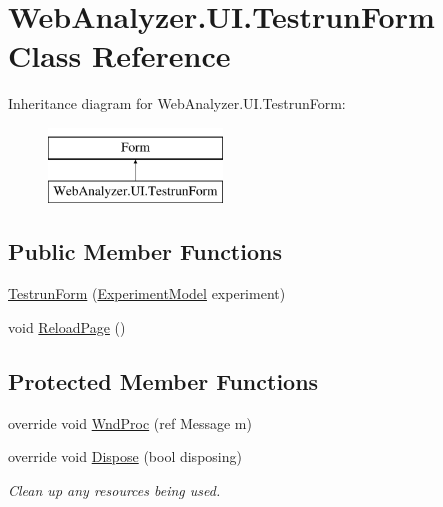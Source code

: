 \hypertarget{class_web_analyzer_1_1_u_i_1_1_testrun_form}{}\section{Web\+Analyzer.\+U\+I.\+Testrun\+Form Class Reference}
\label{class_web_analyzer_1_1_u_i_1_1_testrun_form}
Inheritance diagram for Web\+Analyzer.\+U\+I.\+Testrun\+Form\+:\begin{figure}[H]
\begin{center}
\leavevmode
\includegraphics[height=2.000000cm]{class_web_analyzer_1_1_u_i_1_1_testrun_form}
\end{center}
\end{figure}
\subsection*{Public Member Functions}
\begin{DoxyCompactItemize}
\item 
\hyperlink{class_web_analyzer_1_1_u_i_1_1_testrun_form_a874c60792a2a41b12490c8361336e261}{Testrun\+Form} (\hyperlink{class_web_analyzer_1_1_models_1_1_base_1_1_experiment_model}{Experiment\+Model} experiment)
\item 
void \hyperlink{class_web_analyzer_1_1_u_i_1_1_testrun_form_a672f94a3bc0ee13586c5543484a6e5bc}{Reload\+Page} ()
\end{DoxyCompactItemize}
\subsection*{Protected Member Functions}
\begin{DoxyCompactItemize}
\item 
override void \hyperlink{class_web_analyzer_1_1_u_i_1_1_testrun_form_a6bab770d19d208650e80e3a99d4af112}{Wnd\+Proc} (ref Message m)
\item 
override void \hyperlink{class_web_analyzer_1_1_u_i_1_1_testrun_form_a532f52d26e600d080622a943b4306110}{Dispose} (bool disposing)
\begin{DoxyCompactList}\small\item\em Clean up any resources being used. \end{DoxyCompactList}\end{DoxyCompactItemize}
